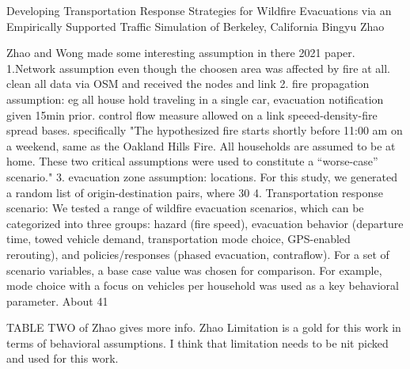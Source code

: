 Developing Transportation Response Strategies for Wildfire Evacuations via an Empirically Supported Traffic Simulation of Berkeley, California
Bingyu Zhao

Zhao and Wong made some interesting assumption in there 2021 paper. 
1.Network assumption even though the choosen area was affected by fire at all. 
clean all data via OSM and received the nodes and link
2. fire propagation assumption: eg all house hold traveling in a single car, evacuation notification given 15min prior. control flow measure allowed on a link
speeed-density-fire spread bases. specifically "The hypothesized fire starts shortly before 11:00 am on a weekend, same as the Oakland Hills Fire. All households are assumed to be at home. These two critical assumptions were used to constitute a “worse-case” scenario."
3. evacuation zone assumption: locations. For this study, we generated a random list of origin-destination pairs, where 30%
4. Transportation response scenario: We tested a range of wildfire evacuation scenarios, which can be categorized into three groups: hazard (fire speed), evacuation behavior (departure time, towed vehicle demand, transportation mode choice, GPS-enabled rerouting), and policies/responses (phased evacuation, contraflow). For a set of scenario variables, a base case value was chosen for comparison.
For example, mode choice with a focus on vehicles per household was used as a key behavioral parameter. About 41%

TABLE TWO of Zhao gives more info. Zhao Limitation is a gold for this work in terms of behavioral assumptions. I think that limitation needs to be nit picked and used for this work. 

